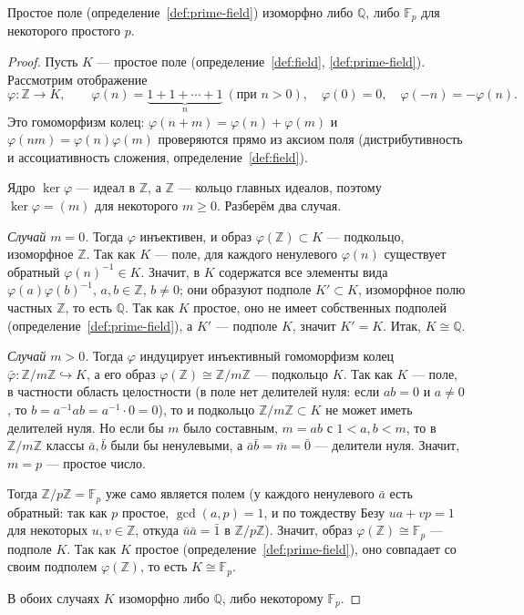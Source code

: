 \documentclass[12pt]{article}
\begin{document}
    \begin{theorem}\label{thm:prime-field-classification}
    	Простое поле (определение~\ref{def:prime-field}) изоморфно либо $\mathbb{Q}$, либо $\mathbb{F}_p$ для некоторого простого $p$.
    \end{theorem}
    \begin{proof}
    	Пусть $K$ --- простое поле (определение~\ref{def:field}, \ref{def:prime-field}). Рассмотрим отображение
    	\[
    	\varphi: \mathbb{Z} \to K, \qquad \varphi(n) = \underbrace{1+1+\cdots+1}_{n}\ (\text{при } n>0),\quad \varphi(0)=0,\quad \varphi(-n)=-\varphi(n).
    	\]
    	Это гомоморфизм колец: $\varphi(n+m)=\varphi(n)+\varphi(m)$ и $\varphi(nm)=\varphi(n)\varphi(m)$ проверяются прямо из аксиом поля (дистрибутивность и ассоциативность сложения, определение~\ref{def:field}).
    
    	Ядро $\ker\varphi$ --- идеал в $\mathbb{Z}$, а $\mathbb{Z}$ --- кольцо главных идеалов, поэтому $\ker\varphi = (m)$ для некоторого $m \geqslant 0$. Разберём два случая.
    
    	\emph{Случай $m=0$.} Тогда $\varphi$ инъективен, и образ $\varphi(\mathbb{Z}) \subset K$ --- подкольцо, изоморфное $\mathbb{Z}$. Так как $K$ --- поле, для каждого ненулевого $\varphi(n)$ существует обратный $\varphi(n)^{-1} \in K$. Значит, в $K$ содержатся все элементы вида $\varphi(a)\varphi(b)^{-1}$, $a,b\in\mathbb{Z}$, $b\ne 0$; они образуют подполе $K' \subset K$, изоморфное полю частных $\mathbb{Z}$, то есть $\mathbb{Q}$. Так как $K$ простое, оно не имеет собственных подполей (определение~\ref{def:prime-field}), а $K'$ --- подполе $K$, значит $K'=K$. Итак, $K \cong \mathbb{Q}$.
    
    	\emph{Случай $m>0$.} Тогда $\varphi$ индуцирует инъективный гомоморфизм колец $\bar\varphi: \mathbb{Z}/m\mathbb{Z} \hookrightarrow K$, а его образ $\varphi(\mathbb{Z}) \cong \mathbb{Z}/m\mathbb{Z}$ --- подкольцо $K$. Так как $K$ --- поле, в частности область целостности (в поле нет делителей нуля: если $ab=0$ и $a\ne0$, то $b = a^{-1}ab = a^{-1}\cdot 0 = 0$), то и подкольцо $\mathbb{Z}/m\mathbb{Z} \subset K$ не может иметь делителей нуля. Но если бы $m$ было составным, $m=ab$ с $1<a,b<m$, то в $\mathbb{Z}/m\mathbb{Z}$ классы $\bar a, \bar b$ были бы ненулевыми, а $\bar a \bar b = \bar m = \bar 0$ --- делители нуля. Значит, $m=p$ --- простое число.
    
    	Тогда $\mathbb{Z}/p\mathbb{Z} = \mathbb{F}_p$ уже само является полем (у каждого ненулевого $\bar a$ есть обратный: так как $p$ простое, $\gcd(a,p)=1$, и по тождеству Безу $ua+vp=1$ для некоторых $u,v\in\mathbb{Z}$, откуда $\bar u \bar a = \bar 1$ в $\mathbb{Z}/p\mathbb{Z}$). Значит, образ $\varphi(\mathbb{Z}) \cong \mathbb{F}_p$ --- подполе $K$. Так как $K$ простое (определение~\ref{def:prime-field}), оно совпадает со своим подполем $\varphi(\mathbb{Z})$, то есть $K \cong \mathbb{F}_p$.
    
    	В обоих случаях $K$ изоморфно либо $\mathbb{Q}$, либо некоторому $\mathbb{F}_p$.
    \end{proof}
    
\end{document}
